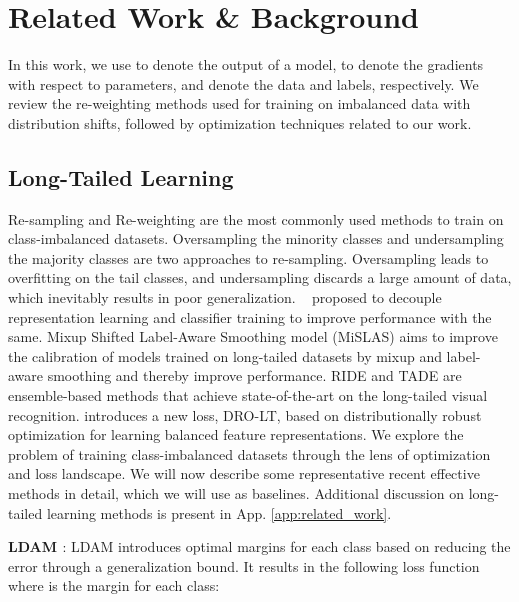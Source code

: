 \documentclass{article}
\begin{document}
\section{Related Work \& Background}
In this work, we use  to denote the output of a model,   to denote the gradients with respect to parameters,  and  denote the data and labels, respectively. 
We review the re-weighting methods used for training on imbalanced data with distribution shifts, followed by optimization techniques related to our work.

\subsection{Long-Tailed Learning}
Re-sampling \cite{buda2018systematic} and Re-weighting \cite{5128907} are the most commonly used methods to train on class-imbalanced datasets. Oversampling the minority classes \cite{chawla2002smote} and undersampling the majority classes \cite{buda2018systematic} are two approaches to re-sampling. Oversampling leads to overfitting on the tail classes, and undersampling discards a large amount of data, which inevitably results in poor generalization. 
~\citet{Kang2020Decoupling} proposed to decouple representation learning and classifier training to improve performance with the same. Mixup Shifted Label-Aware Smoothing model (MiSLAS) \cite{zhong2021improving} aims to improve the calibration of models trained on long-tailed datasets by mixup and label-aware smoothing and thereby improve performance. RIDE \cite{wang2021longtailed} and TADE \cite{zhang2021test} are ensemble-based methods that achieve state-of-the-art on the long-tailed visual recognition.  \citet{Samuel_2021_ICCV} introduces a new loss, DRO-LT, based on distributionally robust optimization for learning balanced feature representations. We explore the problem of training class-imbalanced datasets through the lens of optimization and loss landscape. We will now describe some representative recent effective methods in detail, which we will use as baselines. Additional discussion on long-tailed learning methods is present in App. \ref{app:related_work}.

\textbf{LDAM \cite{cao2019learning}}: LDAM introduces optimal margins for each class based on reducing the error through a generalization bound. It results in the following loss function where  is the margin for each class:
\end{document}
